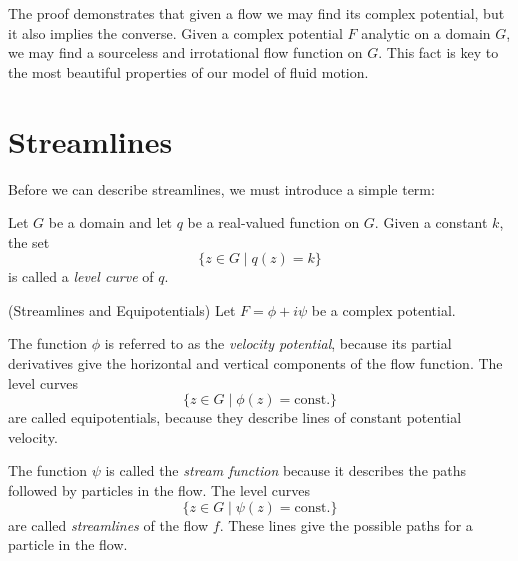 \documentclass[letterpaper, twoside, 12 pt]{article}
\begin{document}
	\begin{remark}
		The proof demonstrates that given a flow we may find its complex potential, but it also implies the converse.
		Given a complex potential $F$ analytic on a domain $G$, we may find a sourceless and irrotational flow function on $G$.
		This fact is key to the most beautiful properties of our model of fluid motion.
	\end{remark}



\section{Streamlines} %
\label{sec:streamlines}

	Before we can describe streamlines, we must introduce a simple term:\
	\begin{definition}
		Let $G$ be a domain and let $q$ be a real-valued function on $G$.
		Given a constant $k$, the set 
		\[
			\{ z \in G \mid q(z) = k \}
		\]
		is called a \textit{level curve} of $q$.
	\end{definition}

	\begin{definition}(Streamlines and Equipotentials)
		Let $F = \phi + i \psi$ be a complex potential.

		The function $\phi$ is referred to as the \textit{velocity potential}, because its partial derivatives give the horizontal and vertical components of the flow function.
		The level curves 
		\[
			\{ z \in G \mid \phi(z) = \mathrm{const.} \}
		\]
		are called equipotentials, because they describe lines of constant potential velocity.

		The function $\psi$ is called the \textit{stream function} because it describes the paths followed by particles in the flow.
		The level curves 
		\[
			\{ z \in G \mid \psi(z) = \mathrm{const.} \}
		\]
		are called \textit{streamlines} of the flow $f$.
		These lines give the possible paths for a particle in the flow.
	\end{definition}
\end{document}
